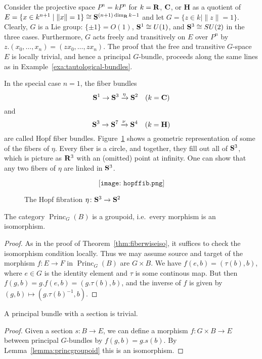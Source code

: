 \documentclass[a4paper,openany]{scrbook}
\DeclareMathOperator{\Princ}{Princ}
\begin{document}
\begin{example}
Consider the projective space $P^n = kP^n$ for $k=\R$, $\CC$, or $\mathbf H$ as a quotient of $E=\{ x \in k^{n+1} \mid \|x\|=1\} \cong \S^{(n+1)\dim_\R k-1}$ and let $G = \{ z \in k \mid \|z\|=1\}$. Clearly, $G$ is a Lie group: $\{\pm 1\}=O(1)$, $\S^1 \cong U(1)$, and $\S^3 \cong SU(2)$ in the three cases. Furthermore, $G$ acts freely and transitively on $E$ over $P^n$ by $z.(x_0,\dots,x_n) = (zx_0,\dots,zx_n)$. The proof that the free and transitive $G$-space $E$ is locally trivial, and hence a principal $G$-bundle, proceeds along the same lines as in Example~\ref{exa:tautological-bundles}.

In the special case $n=1$, the fiber bundles
\[
\S^1 \to \S^3 \xrightarrow{\eta} \S^2 \quad (k=\CC)
\]
and
\[
\S^3 \to \S^7 \xrightarrow{\nu} \S^4 \quad (k=\mathbf H)
\]
are called Hopf fiber bundles. Figure~\ref{fig:hopffib} shows a geometric representation of some of the fibers of $\eta$. Every fiber is a circle, and together, they fill out all of $\S^3$, which is picture as $\R^3$ with an (omitted) point at infinity. One can show that any two fibers of $\eta$ are linked in $\S^3$.
\begin{figure}[ht]\[\texttt{[image: hopffib.png]}\]\caption{The Hopf fibration $\eta\colon \S^3 \to \S^2$}\label{fig:hopffib}\end{figure}
\end{example}

\begin{lemma}\label{lemma:princgroupoid}
The category $\Princ_G(B)$ is a groupoid, i.e.\ every morphism is an isomorphism.
\end{lemma}
\begin{proof}
  As in the proof of Theorem~\ref{thm:fiberwiseiso}, it suffices to check the isomorphism condition locally. Thus we may assume source and target of the morphism $f\colon E \to F$ in $\Princ_G(B)$ are $G \times B$. We have $f(e,b)=(\tau(b),b)$, where $e \in G$ is the identity element and $\tau$ is some continous map. But then $f(g,b) = g.f(e,b)= (g.\tau(b),b)$, and the inverse of $f$ is given by $(g,b) \mapsto (g.\tau(b)^{-1},b)$.
\end{proof}

\begin{corollary}
A principal bundle with a section is trivial.
\end{corollary}
\begin{proof}
  Given a section $s\colon B \to E$, we can define a morphism $f\colon G \times B \rightarrow E$ between principal $G$-bundles by $f(g,b) = g.s(b)$. By Lemma~\ref{lemma:princgroupoid} this is an isomorphism.
\end{proof}
\end{document}

